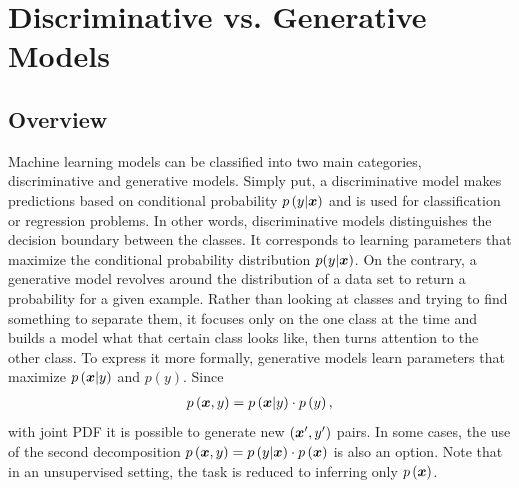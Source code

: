 
\chapter{Discriminative vs. Generative Models}\label{discriminative_modelinmg}
\section{Overview}
Machine learning models can be classified into two main categories, discriminative and generative models. Simply put, a discriminative model makes predictions based on conditional probability $p\left(y|\boldsymbol{x}\right)$ and is used for classification or regression problems. In other words, discriminative models distinguishes the decision boundary between the
classes.  It corresponds to learning parameters that maximize the conditional probability
distribution $p(y|\boldsymbol{x})$. On the contrary, a generative model revolves around the distribution of a data set to return a probability for a given example. Rather than
looking at classes and trying to find something to separate them, it focuses
only on the one class at the time and builds a model what that certain class looks like, then turns attention to the other class. To express it more formally, generative models learn parameters that maximize $p\left(\boldsymbol{x}|y \right)$ and $p\left(y\right)$. Since
\begin{align}\label{eq:prob_decompostion}
p\left(\boldsymbol{x},y\right) = p\left(\boldsymbol{x}|y\right)\cdot p\left(y\right),
\end{align}
with joint PDF it is possible to generate new $\left(\boldsymbol{x}',y'\right)$ pairs. In some cases, the use of the second decomposition $p\left(\boldsymbol{x},y\right) = p\left(y|\boldsymbol{x}\right)\cdot p\left(\boldsymbol{x}\right)$ is also an option.  Note that in an unsupervised setting, the task is reduced to inferring only $p\left(\boldsymbol{x}\right)$.
